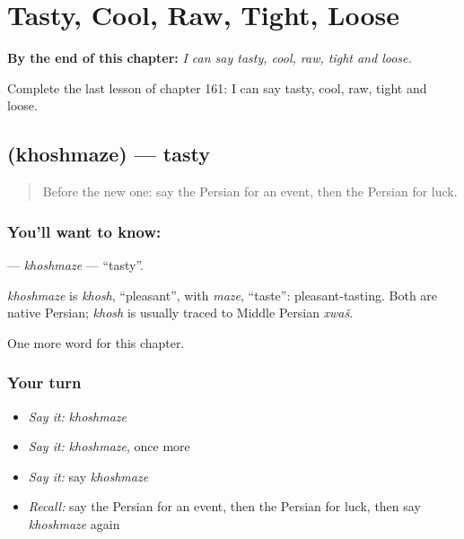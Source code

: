 
\chapter{Tasty, Cool, Raw, Tight, Loose}
\label{ch:fa-tasty-cool-raw-tight-loose}

\begin{chapteropening}
\textbf{By the end of this chapter:} \emph{I can say tasty, cool, raw, tight and loose.}

Complete the last lesson of chapter 161: I can say tasty, cool, raw, tight and loose.
\end{chapteropening}

\section[\texorpdfstring{\fa{خوشمزه} (khoshmaze)}{خوشمزه (khoshmaze)}]{ (khoshmaze) — tasty}

\label{lesson:FA-C161-khoshmaze}



\begin{quote}
Before the new one: say the Persian for an event, then the Persian for luck.
\end{quote}

\subsection*{You'll want to know: }
\textbf{} — \emph{khoshmaze} — \textquotedblleft{}tasty\textquotedblright{}.

\begin{cousinweb}
\emph{khoshmaze} is \emph{khosh}, \textquotedblleft{}pleasant\textquotedblright{}, with \emph{maze}, \textquotedblleft{}taste\textquotedblright{}: pleasant-tasting. Both are native Persian; \emph{khosh} is usually traced to Middle Persian \emph{xwaš}.
\end{cousinweb}

\begin{grammarlens}[title={What you've built}]
One more word for this chapter.
\end{grammarlens}

\subsection*{Your turn}
\begin{itemize}
\raggedright
  \item \emph{Say it:} \emph{khoshmaze}
  \item \emph{Say it:} \emph{khoshmaze}, once more
  \item \emph{Say it:} say \emph{khoshmaze}
  \item \emph{Recall:} say the Persian for an event, then the Persian for luck, then say \emph{khoshmaze} again
\end{itemize}

